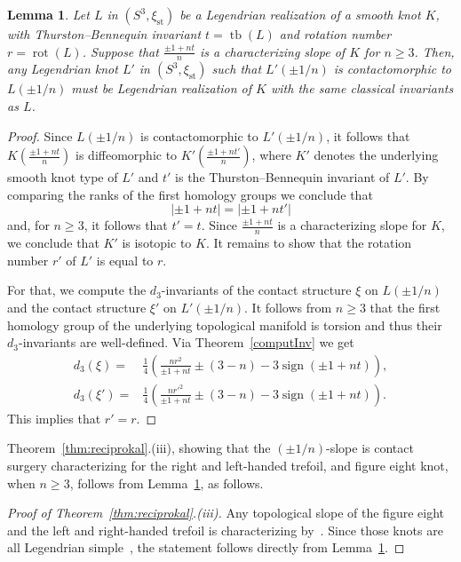 \documentclass[11pt]{amsart} %
\DeclareMathOperator{\tb}{tb}
\DeclareMathOperator{\rot}{rot}
\newcommand{\xist}{\xi_{\mathrm{st}}}
\theoremstyle{plain}
\newtheorem{lem}[Theorem]{Lemma}
\theoremstyle{definition}
\begin{document}
\begin{lem}\label{lem:first}
	Let $L$ in $(S^3,\xist)$ be a Legendrian realization of a smooth knot $K$, with Thurston--Bennequin invariant $t=\tb(L)$ and rotation number $r=\rot(L)$. Suppose that $\frac{\pm1+nt}{n}$ is a characterizing slope of $K$ for $n\geq3$. Then, any Legendrian knot $L'$ in $(S^3,\xist)$ such that $L'(\pm1/n)$ is contactomorphic to $L(\pm1/n)$ must be Legendrian realization of $K$ with the same classical invariants as $L$.
\end{lem}

\begin{proof}
	Since $L(\pm1/n)$ is contactomorphic to $L'(\pm1/n)$, it follows that $K(\frac{\pm1+nt}{n})$ is diffeomorphic to $K'(\frac{\pm1+nt'}{n})$, where $K'$ denotes the underlying smooth knot type of $L'$ and $t'$ is the Thurston--Bennequin invariant of $L'$. By comparing the ranks of the first homology groups we conclude that
	\begin{equation*}
	|\pm1+nt|=|\pm1+nt'|
	\end{equation*}
	and, for $n\geq3$, it follows that $t'=t$. Since $\frac{\pm1+nt}{n}$ is a characterizing slope for $K$, we conclude that $K'$ is isotopic to $K$. It remains to show that the rotation number $r'$ of $L'$ is equal to $r$.
	
	For that, we compute the $d_3$-invariants of the contact structure $\xi$ on $L(\pm1/n)$ and the contact structure $\xi'$ on $L'(\pm1/n)$. It follows from $n\geq3$ that the first homology group of the underlying topological manifold is torsion and thus their $d_3$-invariants are well-defined. Via Theorem~\ref{computInv} we get
	\begin{align*}
	d_3(\xi)=&\frac{1}{4}\left(\frac{nr^2}{\pm1+nt}\pm(3-n)-3\operatorname{sign}(\pm1+nt)\right),\\
	d_3(\xi')=&\frac{1}{4}\left(\frac{nr'^2}{\pm1+nt}\pm(3-n)-3\operatorname{sign}(\pm1+nt)\right).
	\end{align*}
	This implies that $r'=r$. 
\end{proof}


Theorem~\ref{thm:reciprokal}.(iii), showing that the $(\pm 1/n)$-slope is contact surgery characterizing for the right and left-handed trefoil, and figure eight knot, when $n\geq 3$, follows from Lemma~\ref{lem:first}, as follows.

\begin{proof}[Proof of Theorem~\ref{thm:reciprokal}.(iii)]
	Any topological slope of the figure eight and the left and right-handed trefoil is characterizing by~\cite{OzsvathSzabo19}. Since those knots are all Legendrian simple~\cite{EtnyreHonda01b}, the statement follows directly from Lemma~\ref{lem:first}. 
\end{proof}
\end{document}
